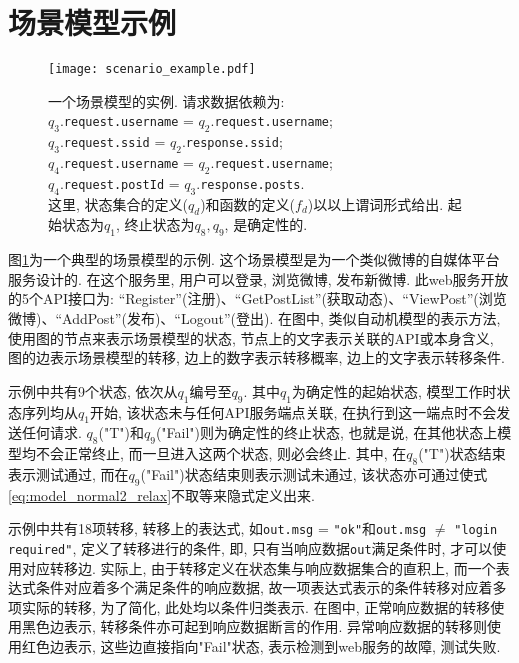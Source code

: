     \section{场景模型示例}
        \begin{figure}[!htb]
            \centering
            \texttt{[image: scenario\_example.pdf]}
            \caption{一个场景模型的实例. 请求数据依赖为: \\
            $q_3$.\texttt{request.username} = $q_2$.\texttt{request.username};\\
            $q_3$.\texttt{request.ssid} = $q_2$.\texttt{response.ssid};\\
            $q_4$.\texttt{request.username} = $q_2$.\texttt{request.username};\\
            $q_4$.\texttt{request.postId} = $q_3$.\texttt{response.posts}.\\
            这里, 状态集合的定义($q_d$)和函数的定义($f_d$)以以上谓词形式给出. 起始状态为$q_1$, 终止状态为$q_8, q_9$, 是确定性的.}
            \label{fig:scenario_example}
        \end{figure}
        
        图\ref{fig:scenario_example}为一个典型的场景模型的示例. 这个场景模型是为一个类似微博的自媒体平台服务设计的. 在这个服务里, 用户可以登录, 浏览微博, 发布新微博. 此web服务开放的5个API接口为: “Register”(注册)、“GetPostList”(获取动态)、“ViewPost”(浏览微博)、“AddPost”(发布)、“Logout”(登出). 在图中, 类似自动机模型的表示方法, 使用图的节点来表示场景模型的状态, 节点上的文字表示关联的API或本身含义, 图的边表示场景模型的转移, 边上的数字表示转移概率, 边上的文字表示转移条件.
        
        示例中共有9个状态, 依次从$q_1$编号至$q_9$. 其中$q_1$为确定性的起始状态, 模型工作时状态序列均从$q_1$开始, 该状态未与任何API服务端点关联, 在执行到这一端点时不会发送任何请求. $q_8$("T")和$q_9$("Fail")则为确定性的终止状态, 也就是说, 在其他状态上模型均不会正常终止, 而一旦进入这两个状态, 则必会终止. 其中, 在$q_8$("T")状态结束表示测试通过, 而在$q_9$("Fail")状态结束则表示测试未通过, 该状态亦可通过使式\ref{eq:model_normal2_relax}不取等来隐式定义出来.
        
        示例中共有18项转移, 转移上的表达式, 如\texttt{out.msg} = \texttt{"ok"}和\texttt{out.msg} $\neq$ \texttt{"login required"}, 定义了转移进行的条件, 即, 只有当响应数据\texttt{out}满足条件时, 才可以使用对应转移边. 实际上, 由于转移定义在状态集与响应数据集合的直积上, 而一个表达式条件对应着多个满足条件的响应数据, 故一项表达式表示的条件转移对应着多项实际的转移, 为了简化, 此处均以条件归类表示. 在图中, 正常响应数据的转移使用黑色边表示, 转移条件亦可起到响应数据断言的作用. 异常响应数据的转移则使用红色边表示, 这些边直接指向"Fail"状态, 表示检测到web服务的故障, 测试失败.
        
